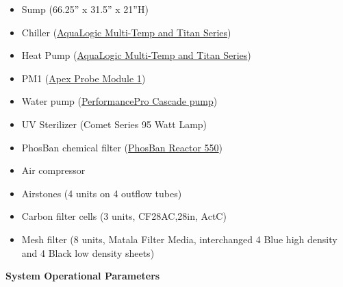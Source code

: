 \documentclass[]{book}
\providecommand{\tightlist}{%
  \setlength{\itemsep}{0pt}\setlength{\parskip}{0pt}}
\begin{document}
\begin{itemize}
\tightlist
\item
  Sump (66.25'' x 31.5'' x 21''H)\\
\item
  Chiller
  (\href{https://github.com/SilbigerLab/Mesocosm_User_Manual/blob/master/Manuals/AquaLogic_Chiller.pdf}{AquaLogic
  Multi-Temp and Titan Series})\\
\item
  Heat Pump
  (\href{https://github.com/SilbigerLab/Mesocosm_User_Manual/blob/master/Manuals/AquaLogic_Chiller.pdf}{AquaLogic
  Multi-Temp and Titan Series})\\
\item
  PM1
  (\href{https://github.com/SilbigerLab/Mesocosm_User_Manual/blob/master/Manuals/PM1_manual.pdf}{Apex
  Probe Module 1})\\
\item
  Water pump
  (\href{https://github.com/SilbigerLab/Mesocosm_User_Manual/blob/master/Manuals/Complete_Cascade.pdf}{PerformancePro
  Cascade pump})\\
\item
  UV Sterilizer (Comet Series 95 Watt Lamp)\\
\item
  PhosBan chemical filter
  (\href{https://github.com/SilbigerLab/Mesocosm_User_Manual/blob/master/Manuals/Phosban_Reactor.pdf}{PhosBan
  Reactor 550})\\
\item
  Air compressor\\
\item
  Airstones (4 units on 4 outflow tubes)\\
\item
  Carbon filter cells (3 units, CF28AC,28in, ActC)\\
\item
  Mesh filter (8 units, Matala Filter Media, interchanged 4 Blue high
  density and 4 Black low density sheets)
\end{itemize}

 \textbf{System Operational Parameters}
\end{document}
